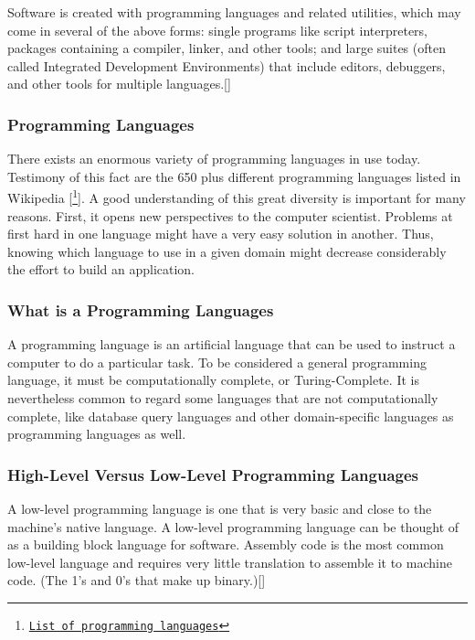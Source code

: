 Software is created with programming languages and related utilities, which may come in several of the above forms: single programs like script interpreters, packages containing a compiler, linker, and other tools; and large suites (often called Integrated Development Environments) that include editors, debuggers, and other tools for multiple languages.[\cite{6}] 
\newline

\subsubsection*{Programming Languages}
There exists an enormous variety of programming languages in use today. Testimony of this fact are the 650 plus different programming languages listed in Wikipedia [\footnote{\href{http://en.wikipedia.org/wiki/List\_of\_programming\_languages}{\texttt{List of programming languages}}}]. A good understanding of this great diversity is important for many reasons. First, it opens new perspectives to the computer scientist. Problems at first hard in one language might have a very easy solution in another. Thus, knowing which language to use in a given domain might decrease considerably the effort to build an application.


\subsubsection*{What is a Programming Languages}
A programming language is an artificial language that can be used to instruct a computer to do a particular task. To be considered a general programming language, it must be computationally complete, or Turing-Complete. It is nevertheless common to regard some languages that are not computationally complete, like database query languages and other domain-specific languages as programming languages as well.

\subsubsection*{High-Level Versus Low-Level Programming Languages}

A low-level programming language is one that is very basic and close to the machine's native language. A low-level programming language can be thought of as a building block language for software. Assembly code is the most common low-level language and requires very little translation to assemble it to machine code. (The 1's and 0's that make up binary.)[\cite{6}]
\newline

